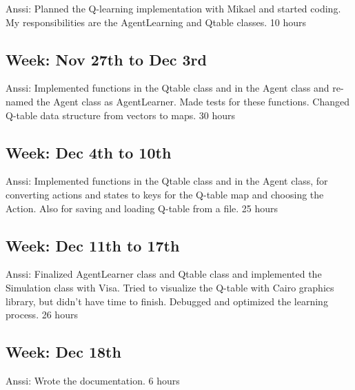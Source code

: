 \documentclass{article}
\begin{document}
Anssi:
Planned the Q-learning implementation with Mikael and started coding.
My responsibilities are the AgentLearning and Qtable classes.
10 hours

\subsection{Week: Nov 27th to Dec 3rd}

Anssi:
Implemented functions in the Qtable class and in the Agent class and
re-named the Agent class as AgentLearner. Made tests for these functions.
Changed Q-table data structure from vectors to maps.
30 hours

\subsection{Week: Dec 4th to 10th}

Anssi:
Implemented functions in the Qtable class and in the Agent class, for
converting actions and states to keys for the Q-table map and choosing
the Action. Also for saving and loading Q-table from a file.
25 hours

\subsection{Week: Dec 11th to 17th}

Anssi:
Finalized AgentLearner class and Qtable class and implemented the
Simulation class with Visa. Tried to visualize the Q-table with
Cairo graphics library, but didn’t have time to finish. Debugged
and optimized  the learning process.
26 hours

\subsection{Week: Dec 18th}

Anssi:
Wrote the documentation.
6 hours
\end{document}
